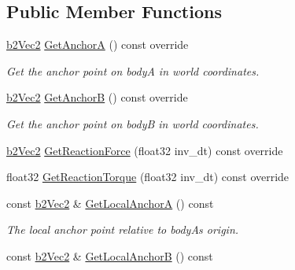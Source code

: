 \subsection*{Public Member Functions}
\begin{DoxyCompactItemize}
\item 
\mbox{\label{classb2DistanceJoint_ae228d3ce27009acd8a20c2570fb1183c}} 
\mbox{\hyperlink{structb2Vec2}{b2\+Vec2}} \mbox{\hyperlink{classb2DistanceJoint_ae228d3ce27009acd8a20c2570fb1183c}{Get\+AnchorA}} () const override
\begin{DoxyCompactList}\small\item\em Get the anchor point on bodyA in world coordinates. \end{DoxyCompactList}\item 
\mbox{\label{classb2DistanceJoint_a05bf71de10904c87e3a5295aa04a8aa6}} 
\mbox{\hyperlink{structb2Vec2}{b2\+Vec2}} \mbox{\hyperlink{classb2DistanceJoint_a05bf71de10904c87e3a5295aa04a8aa6}{Get\+AnchorB}} () const override
\begin{DoxyCompactList}\small\item\em Get the anchor point on bodyB in world coordinates. \end{DoxyCompactList}\item 
\mbox{\hyperlink{structb2Vec2}{b2\+Vec2}} \mbox{\hyperlink{classb2DistanceJoint_a6aa951e5bbfcae8a617987955cadbed5}{Get\+Reaction\+Force}} (float32 inv\+\_\+dt) const override
\item 
float32 \mbox{\hyperlink{classb2DistanceJoint_ad7ac78c4c20c122b944947d523a02982}{Get\+Reaction\+Torque}} (float32 inv\+\_\+dt) const override
\item 
\mbox{\label{classb2DistanceJoint_aaa881128071c62f21898a75d5b20308a}} 
const \mbox{\hyperlink{structb2Vec2}{b2\+Vec2}} \& \mbox{\hyperlink{classb2DistanceJoint_aaa881128071c62f21898a75d5b20308a}{Get\+Local\+AnchorA}} () const
\begin{DoxyCompactList}\small\item\em The local anchor point relative to bodyA\textquotesingle{}s origin. \end{DoxyCompactList}\item 
\mbox{\label{classb2DistanceJoint_a214a1cca8854613d7401c9a5892a28c9}} 
const \mbox{\hyperlink{structb2Vec2}{b2\+Vec2}} \& \mbox{\hyperlink{classb2DistanceJoint_a214a1cca8854613d7401c9a5892a28c9}{Get\+Local\+AnchorB}} () const

\end{DoxyCompactItemize}
